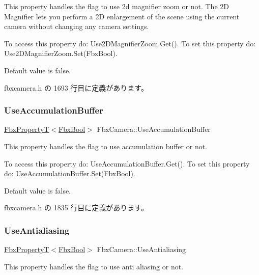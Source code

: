 This property handles the flag to use 2d magnifier zoom or not. The 2D Magnifier lets you perform a 2D enlargement of the scene using the current camera without changing any camera settings.

To access this property do\+: Use2\+D\+Magnifier\+Zoom.\+Get(). To set this property do\+: Use2\+D\+Magnifier\+Zoom.\+Set(\+Fbx\+Bool).

Default value is false. 

 fbxcamera.\+h の 1693 行目に定義があります。

\mbox{\label{class_fbx_camera_ae858c35fdbb3ec3bb853bfa739dd2fad}} 
\subsubsection{\texorpdfstring{Use\+Accumulation\+Buffer}{UseAccumulationBuffer}}
{\footnotesize\ttfamily \hyperlink{class_fbx_property_t}{Fbx\+PropertyT}$<$\hyperlink{fbxtypes_8h_a92e0562b2fe33e76a242f498b362262e}{Fbx\+Bool}$>$ Fbx\+Camera\+::\+Use\+Accumulation\+Buffer}

This property handles the flag to use accumulation buffer or not.

To access this property do\+: Use\+Accumulation\+Buffer.\+Get(). To set this property do\+: Use\+Accumulation\+Buffer.\+Set(\+Fbx\+Bool).

Default value is false. 

 fbxcamera.\+h の 1835 行目に定義があります。

\mbox{\label{class_fbx_camera_a2d23acad0d49eadb63be01b826404d34}} 
\subsubsection{\texorpdfstring{Use\+Antialiasing}{UseAntialiasing}}
{\footnotesize\ttfamily \hyperlink{class_fbx_property_t}{Fbx\+PropertyT}$<$\hyperlink{fbxtypes_8h_a92e0562b2fe33e76a242f498b362262e}{Fbx\+Bool}$>$ Fbx\+Camera\+::\+Use\+Antialiasing}

This property handles the flag to use anti aliasing or not.

